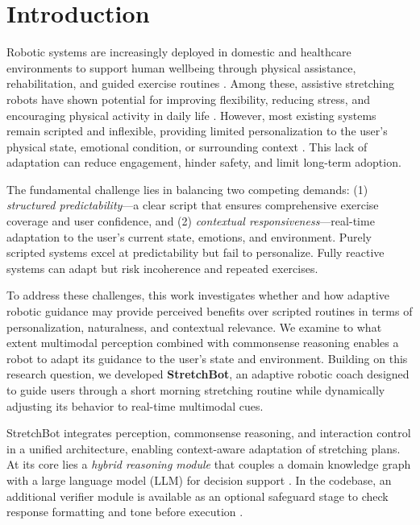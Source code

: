 \documentclass[pdflatex,sn-basic,Numbered,iicol,twocolumn]{sn-jnl}%
\begin{document}
\maketitle

\section{Introduction}
\label{sec:intro}

Robotic systems are increasingly deployed in domestic and healthcare environments to support human wellbeing through physical assistance, rehabilitation, and guided exercise routines \cite{Tapus2007,Broadbent2012}. Among these, assistive stretching robots have shown potential for improving flexibility, reducing stress, and encouraging physical activity in daily life \cite{Robins2012}. However, most existing systems remain scripted and inflexible, providing limited personalization to the user's physical state, emotional condition, or surrounding context \cite{Aceituno-Valenzuela2020}. This lack of adaptation can reduce engagement, hinder safety, and limit long-term adoption.

The fundamental challenge lies in balancing two competing demands: (1) \textit{structured predictability}—a clear script that ensures comprehensive exercise coverage and user confidence, and (2) \textit{contextual responsiveness}—real-time adaptation to the user's current state, emotions, and environment. Purely scripted systems excel at predictability but fail to personalize. Fully reactive systems can adapt but risk incoherence and repeated exercises.

To address these challenges, this work investigates whether and how adaptive robotic guidance may provide perceived benefits over scripted routines in terms of personalization, naturalness, and contextual relevance. We examine to what extent multimodal perception combined with commonsense reasoning enables a robot to adapt its guidance to the user's state and environment. Building on this research question, we developed \textbf{StretchBot}, an adaptive robotic coach designed to guide users through a short morning stretching routine while dynamically adjusting its behavior to real-time multimodal cues.

StretchBot integrates perception, commonsense reasoning, and interaction control in a unified architecture, enabling context-aware adaptation of stretching plans. At its core lies a \textit{hybrid reasoning module} that couples a domain knowledge graph with a large language model (LLM) for decision support \cite{Hogan2021,Speer2017}. In the codebase, an additional verifier module is available as an optional safeguard stage to check response formatting and tone before execution \cite{Thawani2021}.
\end{document}
